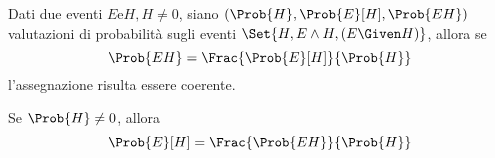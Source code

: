 \documentclass{subfiles}
\begin{document}
\begin{Theorem}
    Dati due eventi $E \text{e} H, H \neq 0$, siano $(\Prob{H}, \Prob{E}[H], \Prob{EH})$ valutazioni di probabilità sugli eventi $\Set{H, E \land H, (E \Given H)}$,
    allora se
    $$
        \Prob{EH} = \Frac{\Prob{E}[H]}{\Prob{H}}
    $$
    l'assegnazione risulta essere coerente.
\end{Theorem}
\begin{Corollary}
    Se $\Prob{H} \neq 0$, allora
    $$
        \Prob{E}[H] = \Frac{\Prob{EH}}{\Prob{H}}
    $$
\end{Corollary}
\end{document}
